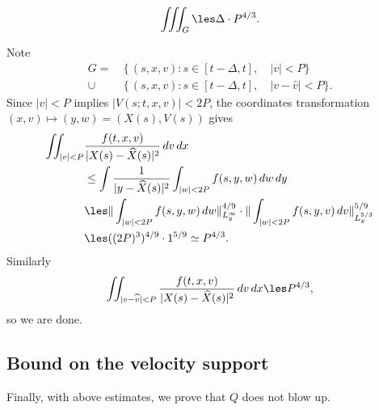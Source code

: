 \documentclass[11pt]{amsart}
\begin{document}
\begin{prop}
\[\iiint_G\les\Delta\cdot P^{4/3}.\]
\end{prop}
\begin{pf}
Note
\begin{align*}
G=\ &\{\,(s,x,v):s\in[t-\Delta,t],\quad|v|<P\}\\
\cup\ &\{\,(s,x,v):s\in[t-\Delta,t],\quad|v-\hat v|<P\}.
\end{align*}
Since $|v|<P$ implies $|V(s;t,x,v)|<2P$, the coordinates transformation $(x,v)\mapsto(y,w)=(X(s),V(s))$ gives
\begin{align*}
\iint_{|v|<P}&\frac{f(t,x,v)}{|X(s)-\hat X(s)|^2}\,dv\,dx\\
&\le\int\frac1{|y-\hat X(s)|^2}\int_{|w|<2P}f(s,y,w)\,dw\,dy\\
&\les\|\int_{|w|<2P}f(s,y,w)\,dw\|_{L_y^\infty}^{4/9}\cdot\|\int_{|w|<2P}f(s,y,v)\,dv\|_{L_y^{5/3}}^{5/9}\\
&\les((2P)^3)^{4/9}\cdot1^{5/9}\simeq P^{4/3}.
\end{align*}
Similarly
\[\iint_{|v-\hat v|<P}\frac{f(t,x,v)}{|X(s)-\hat X(s)|^2}\,dv\,dx\les P^{4/3},\]
so we are done.
\end{pf}


\subsection{Bound on the velocity support}
Finally, with above estimates, we prove that $Q$ does not blow up.
\end{document}
